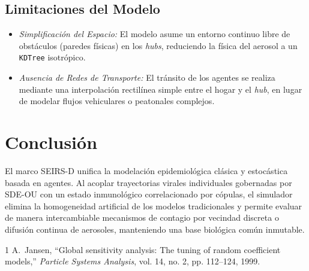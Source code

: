 \documentclass[conference]{IEEEtran}
\begin{document}
\subsection{Limitaciones del Modelo}
\begin{itemize}
    \item \textit{Simplificación del Espacio:} El modelo asume un entorno continuo libre de obstáculos (paredes físicas) en los \textit{hubs}, reduciendo la física del aerosol a un \texttt{KDTree} isotrópico.
    \item \textit{Ausencia de Redes de Transporte:} El tránsito de los agentes se realiza mediante una interpolación rectilínea simple entre el hogar y el \textit{hub}, en lugar de modelar flujos vehiculares o peatonales complejos.
\end{itemize}

\section{Conclusión}
El marco SEIRS-D unifica la modelación epidemiológica clásica y estocástica basada en agentes. Al acoplar trayectorias virales individuales gobernadas por SDE-OU con un estado inmunológico correlacionado por cópulas, el simulador elimina la homogeneidad artificial de los modelos tradicionales y permite evaluar de manera intercambiable mecanismos de contagio por vecindad discreta o difusión continua de aerosoles, manteniendo una base biológica común inmutable.


\begin{thebibliography}{1}
A.~Jansen, ``Global sensitivity analysis: The tuning of random coefficient models,'' \emph{Particle Systems Analysis}, vol. 14, no. 2, pp. 112--124, 1999.
\end{thebibliography}
\end{document}

